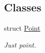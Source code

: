 \subsection*{Classes}
\begin{DoxyCompactItemize}
\item 
struct \hyperlink{struct_point}{Point}
\begin{DoxyCompactList}\small\item\em Just point. \end{DoxyCompactList}\end{DoxyCompactItemize}
